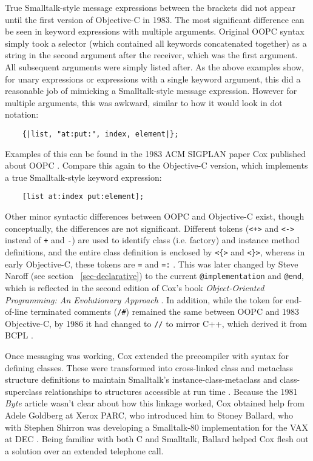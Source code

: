 \documentclass[acmsmall,screen]{acmart}
\begin{document}
True Smalltalk-style message expressions between the brackets did not appear until the first version of Objective-C in 1983. The most significant difference can be seen in keyword expressions with multiple arguments. Original OOPC syntax simply took a selector (which contained all keywords concatenated together) as a string in the second argument after the receiver, which was the first argument. All subsequent arguments were simply listed after. As the above examples show, for unary expressions or expressions with a single keyword argument, this did a reasonable job of mimicking a Smalltalk-style message expression. However for multiple arguments, this was awkward, similar to how it would look in dot notation:
\begin{verbatim}
    {|list, "at:put:", index, element|};
\end{verbatim}
Examples of this can be found in the 1983 ACM SIGPLAN paper Cox published about OOPC \citep[16--18, 21]{cox_object_1983}.
Compare this again to the Objective-C version, which implements a true Smalltalk-style keyword expression:
\begin{verbatim}
    [list at:index put:element];
\end{verbatim}
Other minor syntactic differences between OOPC and Objective-C exist, though conceptually, the differences are not significant. Different tokens (\verb|<+>| and \verb|<->| instead of \verb|+| and \verb|-|) are used to identify class (i.e. factory) and instance method definitions, and the entire class definition is enclosed by \verb|<{>| and \verb|<}>|, whereas in early Objective-C, these tokens are \verb|=| and \verb|=:| \citetext{\citealp[17]{cox_object_1983}; \citealp[55]{cox_message/object_1984}; \citealp[84]{cox_object-oriented_1986}}. This was later changed by Steve Naroff (see section ~\ref{sec-declarative}) to the current \verb|@implementation| and \verb|@end|, which is reflected in the second edition of Cox's book \emph{Object-Oriented Programming: An Evolutionary Approach} \citep[88]{cox_object-oriented_1991}. In addition, while the token for end-of-line terminated comments (\verb|/#|) remained the same between OOPC and 1983 Objective-C, by 1986 it had changed to \verb|//| to mirror C++, which derived it from BCPL \citetext{\citealp[17]{cox_object_1983}; \citealp[55]{cox_message/object_1984}; \citealp[60--61]{cox_object-oriented_1986}; \citealp[21]{stroustrup_history_1993}}.

Once messaging was working, Cox extended the precompiler with syntax for defining classes. These were transformed into cross-linked class and metaclass structure definitions to maintain Smalltalk's instance-class-metaclass and class-superclass relationships to structures accessible at run time \citep{goldberg_smalltalk-80_1983}. Because the 1981 \emph{Byte} article wasn't clear about how this linkage worked, Cox obtained help from Adele Goldberg at Xerox PARC, who introduced him to Stoney Ballard, who with Stephen Shirron was developing a Smalltalk-80 implementation for the VAX at DEC \citep{krasner_smalltalk-80_1984}. Being familiar with both C and Smalltalk, Ballard helped Cox flesh out a solution over an extended telephone call. 
\end{document}
